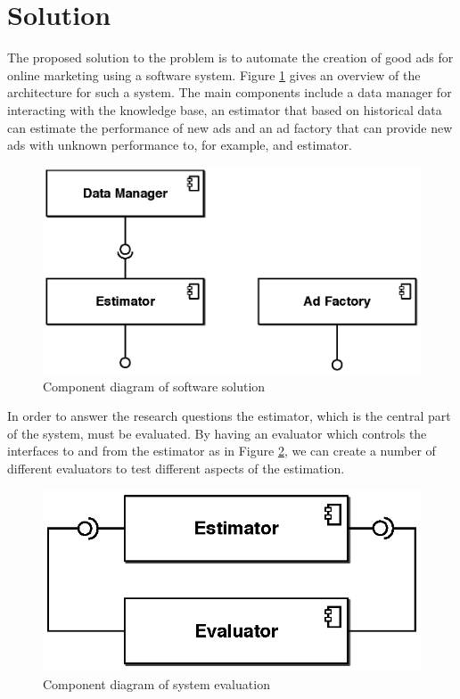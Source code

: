 \documentclass{sig-alternate}
\begin{document}
\section{Solution}
\label{ch:Solution}
The proposed solution to the problem is to automate the creation of good ads for online marketing using a software system. Figure \ref{fig:SWArchitecture} gives an overview of the architecture for such a system. The main components include a data manager for interacting with the knowledge base, an estimator that based on historical data can estimate the performance of new ads and an ad factory that can provide new ads with unknown performance to, for example, and estimator.

\begin{figure}[htpb]
	\centering
	\includegraphics[width=\columnwidth]{sw-architecture.eps}
	\caption{Component diagram of software solution}
	\label{fig:SWArchitecture}
\end{figure}

In order to answer the research questions the estimator, which is the central part of the system, must be evaluated. By having an evaluator which controls the interfaces to and from the estimator as in Figure \ref{fig:SWEvaluator}, we can create a number of different evaluators to test different aspects of the estimation.

\begin{figure}[htpb]
	\centering
	\includegraphics[width=0.65\columnwidth]{sw-evaluator.eps}
	\caption{Component diagram of system evaluation}
	\label{fig:SWEvaluator}
\end{figure}
\end{document}
